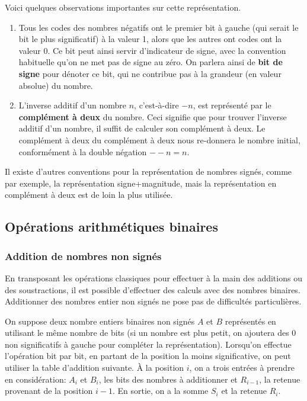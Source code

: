 \documentclass[11pt]{article}
\begin{document}
Voici quelques observations importantes sur cette représentation.

\begin{enumerate}
\item Tous les codes des nombres négatifs ont le premier bit à gauche
(qui serait le bit le plus significatif) à la valeur 1, alors que
les autres ont codes ont la valeur 0. Ce bit peut ainsi servir
d'indicateur de signe, avec la convention habituelle qu'on ne met
pas de signe au zéro. On parlera ainsi de \textbf{bit de signe} pour
dénoter ce bit, qui ne contribue pas à la grandeur (en valeur
absolue) du nombre.

\item L'inverse additif d'un nombre \(n\), c'est-à-dire \(-n\), est
représenté par le \textbf{complément à deux} du nombre. Ceci signifie que
pour trouver l'inverse additif d'un nombre, il suffit de calculer
son complément à deux. Le complément à deux du complément à deux nous
re-donnera le nombre initial, conformément à la double négation
\(--n = n\).
\end{enumerate}

Il existe d'autres conventions pour la représentation de nombres
signés, comme par exemple, la représentation signe+magnitude, mais la
représentation en complément à deux est de loin la plus utilisée.

\subsection{Opérations arithmétiques binaires}
\label{sec:orgca45c03}

\subsubsection{Addition de nombres non signés}
\label{sec:org23f8ef8}

En transposant les opérations classiques pour effectuer à la main des
additions ou des soustractions, il est possible d'effectuer des
calculs avec des nombres binaires. Additionner des nombres entier non
signés ne pose pas de difficultés particulières.

On suppose deux nombre entiers binaires non signés \(A\) et \(B\)
représentés en utilisant le même nombre de bits (si un nombre est plus
petit, on ajoutera des 0 non significatifs à gauche pour compléter la
représentation). Lorsqu'on effectue l'opération bit par bit, en
partant de la position la moins significative, on peut utiliser la
table d'addition suivante. À la position \(i\), on a trois entrées à
prendre en considération: \(A_{i}\) et \(B_{i}\), les bits des nombres
à additionner et \(R_{i-1}\), la retenue provenant de la position
\(i-1\). En sortie, on a la somme \(S_{i}\) et la retenue \(R_{i}\).
\end{document}
